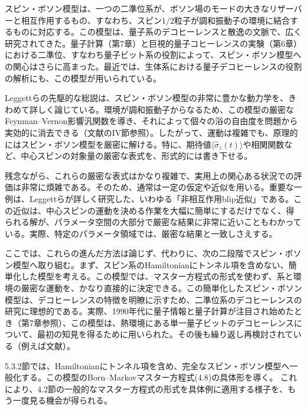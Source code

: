 \hypertarget{srcpage:207}{}\label{srcpage:207}
スピン・ボソン模型は、一つの二準位系が、ボソン場のモードの大きなリザーバーと相互作用するもの、すなわち、スピン$1/2$粒子が調和振動子の環境に結合するものに対応する。この模型は、量子系のデコヒーレンスと散逸の文脈で、広く研究されてきた。量子計算（第7章）と巨視的量子コヒーレンスの実験（第6章）における二準位、すなわち量子ビット系の役割によって、スピン・ボソン模型への関心はさらに高まった。最近では、生体系における量子デコヒーレンスの役割の解析にも、この模型が用いられている\cite{ref235}。

Leggettらの先駆的な総説\cite{ref209}は、スピン・ボソン模型の非常に豊かな動力学を、きわめて詳しく論じている。環境が調和振動子からなるため、この模型の厳密なFeynman--Vernon影響汎関数\cite{ref211}を導き、それによって個々の浴の自由度を問題から実効的に消去できる（文献\cite{ref209}のIV節参照）。したがって、運動は複雑でも、原理的にはスピン・ボソン模型を厳密に解ける。特に、期待値$\langle\hat\sigma_z(t)\rangle$や相関関数など、中心スピンの対象量の厳密な表式を、形式的には書き下せる。

残念ながら、これらの厳密な表式はかなり複雑で、実用上の関心ある状況での評価は非常に煩雑である。そのため、通常は一定の仮定や近似を用いる。重要な一例は、Leggettら\cite{ref209}が詳しく研究した、いわゆる「非相互作用blip近似」である。この近似は、中心スピンの運動を決める作業を大幅に簡単にするだけでなく、得られる解が、パラメータ空間の大部分で厳密な結果に非常に近いこともわかっている。実際、特定のパラメータ領域では、厳密な結果と一致しさえする。

ここでは、これらの進んだ方法は論じず、代わりに、次の二段階でスピン・ボソン模型へ取り組む。まず、スピン系のHamiltonianにトンネル項を含めない、簡単化した模型を考える。この模型では、マスター方程式の形式を使わず、系と環境の厳密な運動を、かなり直接的に決定できる。この簡単化したスピン・ボソン模型は、デコヒーレンスの特徴を明瞭に示すため、二準位系のデコヒーレンスの研究に理想的である。実際、1990年代に量子情報と量子計算が注目され始めたとき（第7章参照）、この模型は、熱環境にある単一量子ビットのデコヒーレンスについて、最初の知見を得るために用いられた\cite{ref089,ref236}。その後も繰り返し再検討されている（例えば文献\cite{ref096,ref237}）。

5.3.2節では、Hamiltonianにトンネル項を含め、完全なスピン・ボソン模型へ一般化する。この模型のBorn--Markovマスター方程式(4.8)の具体形を導く。
\hypertarget{srcpage:208}{}\label{srcpage:208}
これにより、4.2節の一般的なマスター方程式の形式を具体例に適用する様子を、もう一度見る機会が得られる。


